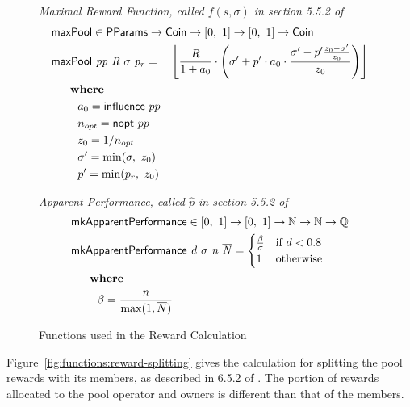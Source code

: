 \begin{figure}[htb]
  \emph{Maximal Reward Function, called $f(s,\sigma)$ in section 5.5.2 of~\cite{delegation_design}}
  \begin{align*}
      & \fun{maxPool} \in \PParams \to \Coin \to \unitInterval \to \unitInterval \to \Coin \\
      & \fun{maxPool}~\var{pp}~\var{R}~\sigma~\var{p_r} =
          ~~~\floor*{
             \frac{R}{1 + a_0}
             \cdot
             \left(
               \sigma' + p'\cdot a_0\cdot\frac{\sigma' - p'\frac{z_0-\sigma'}{z_0}}{z_0}
             \right)} \\
      & ~~~\where \\
      & ~~~~~~~a_0 = \fun{influence}~pp \\
      & ~~~~~~~n_{opt} = \fun{nopt}~pp \\
      & ~~~~~~~z_0 = 1/n_{opt} \\
      & ~~~~~~~\sigma'=\min(\sigma,~z_0) \\
      & ~~~~~~~p'=\min(p_r,~z_0) \\
  \end{align*}

  \emph{Apparent Performance, called $\hat{p}$ in section 5.5.2 of~\cite{delegation_design}}
  \begin{align*}
      & \fun{mkApparentPerformance} \in \unitInterval \to \unitInterval \to \N \to \N \to \Q \\
      & \mkApparentPerformance{d}{\sigma}{n}{\overline{N}} =
        \begin{cases}
          \frac{\beta}{\sigma} & \text{if } d < 0.8 \\
          1 & \text{otherwise}
        \end{cases} \\
      & ~~~\where \\
      & ~~~~~~~\beta = \frac{n}{\max(1, \overline{N})} \\
  \end{align*}
  \caption{Functions used in the Reward Calculation}
  \label{fig:functions:rewards}
\end{figure}

\clearpage

Figure~\ref{fig:functions:reward-splitting} gives the calculation for
splitting the pool rewards with its members, as described in 6.5.2 of \cite{delegation_design}.
The portion of rewards allocated to the pool operator and owners is different
than that of the members.

